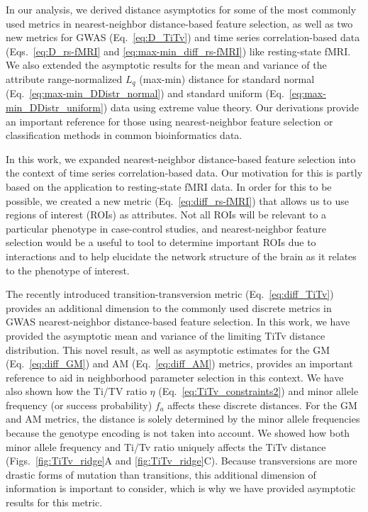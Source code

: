 \documentclass[10pt,letterpaper]{article}
\begin{document}
In our analysis, we derived distance asymptotics for some of the most commonly used metrics in nearest-neighbor distance-based feature selection, as well as two new metrics for GWAS (Eq.~\ref{eq:D_TiTv}) and time series correlation-based data (Eqs.~\ref{eq:D_rs-fMRI} and \ref{eq:max-min_diff_rs-fMRI}) like resting-state fMRI. We also extended the asymptotic results for the mean and variance of the attribute range-normalized $L_q$ (max-min) distance for standard normal (Eq.~\ref{eq:max-min_DDistr_normal}) and standard uniform (Eq.~\ref{eq:max-min_DDistr_uniform}) data using extreme value theory. Our derivations provide an important reference for those using nearest-neighbor feature selection or classification methods in common bioinformatics data. 

In this work, we expanded nearest-neighbor distance-based feature selection into the context of time series correlation-based data. Our motivation for this is partly based on the application to resting-state fMRI data. In order for this to be possible, we created a new metric (Eq.~\ref{eq:diff_rs-fMRI}) that allows us to use regions of interest (ROIs) as attributes. Not all ROIs will be relevant to a particular phenotype in case-control studies, and nearest-neighbor feature selection would be a useful to tool to determine important ROIs due to interactions and to help elucidate the network structure of the brain as it relates to the phenotype of interest.

The recently introduced transition-transversion metric (Eq.~\ref{eq:diff_TiTv}) provides an additional dimension to the commonly used discrete metrics in GWAS nearest-neighbor distance-based feature selection. In this work, we have provided the asymptotic mean and variance of the limiting TiTv distance distribution. This novel result, as well as asymptotic estimates for the GM (Eq.~\ref{eq:diff_GM}) and AM (Eq.~\ref{eq:diff_AM}) metrics, provides an important reference to aid in neighborhood parameter selection in this context. We have also shown how the Ti/TV ratio $\eta$ (Eq.~\ref{eq:TiTv_constraints2}) and minor allele frequency (or success probability) $f_a$ affects these discrete distances. For the GM and AM metrics, the distance is solely determined by the minor allele frequencies because the genotype encoding is not taken into account. We showed how both minor allele frequency and Ti/Tv ratio uniquely affects the TiTv distance (Figs.~\ref{fig:TiTv_ridge}A and \ref{fig:TiTv_ridge}C). Because transversions are more drastic forms of mutation than transitions, this additional dimension of information is important to consider, which is why we have provided asymptotic results for this metric.
\end{document}
